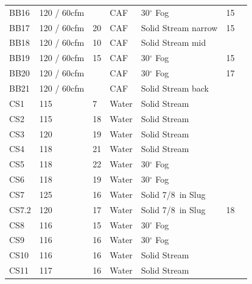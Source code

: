 \documentclass[12pt,oneside]{book}
\begin{document}
\begin{table}[!ht]
\begin{tabular}{lllllll}
BB16       &   120 / 60cfm      &               & CAF    &  30$^{\circ}$ Fog   & 15                 &          \\
BB17       &   120 / 60cfm      & 20            & CAF    &  Solid Stream narrow & 15                &          \\
BB18       &   120 / 60cfm      & 10            & CAF    &  Solid Stream mid   &                    &          \\
BB19       &   120 / 60cfm      & 15            & CAF    &  30$^{\circ}$ Fog   & 15                 &          \\
BB20       &   120 / 60cfm      &               & CAF    &  30$^{\circ}$ Fog   & 17                 &          \\
BB21       &   120 / 60cfm      &               & CAF    &  Solid Stream back  &                    &          \\
CS1        &   115              & 7             & Water  &  Solid Stream       &                    &          \\
CS2        &   115              & 18            & Water  &  Solid Stream       &                    &          \\
CS3        &   120              & 19            & Water  &  Solid Stream       &                    &          \\
CS4        &   118              & 21            & Water  &  Solid Stream       &                    &          \\
CS5        &   118              & 22            & Water  &  30$^{\circ}$ Fog   &                    &          \\
CS6        &   118              & 19            & Water  &  30$^{\circ}$ Fog   &                    &          \\
CS7        &   125              & 16            & Water  &  Solid 7/8~in Slug  &                    &          \\
CS7.2      &   120              & 17            & Water  &  Solid 7/8~in Slug  & 18                 &          \\
CS8        &   116              & 15            & Water  &  30$^{\circ}$ Fog   &                    &          \\
CS9        &   116              & 16            & Water  &  30$^{\circ}$ Fog   &                    &          \\
CS10       &   116              & 16            & Water  &  Solid Stream       &                    &          \\
CS11       &   117              & 16            & Water  &  Solid Stream       &                    &          \\
\bottomrule[1.25pt]
\end{tabular}\par
\end{table}
\end{document}
